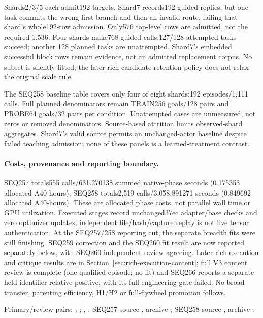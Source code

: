 \documentclass[11pt]{article}
\begin{document}
Shards2/3/5 each admit192 targets. Shard7 records192 guided replies, but one task
commits the wrong first branch and then an invalid route, failing that shard's
whole192-row admission. Only576 top-level rows are admitted, not the required
1,536. Four shards make768 guided calls:127/128 attempted tasks succeed; another
128 planned tasks are unattempted. Shard7's embedded successful block rows remain
evidence, not an admitted replacement corpus. No subset is silently fitted;
the later rich candidate-retention policy does not relax the original scale rule.

The SEQ258 baseline table covers only four of eight shards:192 episodes/1,111
calls. Full planned denominators remain TRAIN256 goals/128 pairs and PROBE64
goals/32 pairs per condition. Unattempted cases are unmeasured, not zeros or
removed denominators. Source-based attrition limits observed-shard aggregates.
Shard7's valid source permits an unchanged-actor baseline despite failed teaching
admission; none of these panels is a learned-treatment contrast.

\paragraph{Costs, provenance and reporting boundary.}
SEQ257 totals555 calls/631.270138 summed native-phase seconds (0.175353 allocated
A40-hours); SEQ258 totals2,519 calls/3,058.891271 seconds (0.849692 allocated
A40-hours). These are allocated phase costs, not parallel wall time or GPU
utilization. Executed stages record unchanged37ec adapter/base checks and zero
optimizer updates; independent file/hash/capture replay is not live tensor
authentication. At the SEQ257/258 reporting cut, the separate breadth fits were
still finishing. SEQ259 correction and the SEQ260 fit result are now reported
separately below, with SEQ260 independent review agreeing. Later rich execution
and critique results are in Section~\ref{sec:rich-execution-content}; full V3
content review is complete (one qualified episode; no fit) and SEQ266 reports
a separate held-identifier relative positive, with its full engineering gate failed. No broad transfer, parenting
efficiency, H1/H2 or full-flywheel promotion follows.

Primary/review pairs:
,
;
,
.
SEQ257 source , archive
;
SEQ258 source , archive
.
\end{document}
